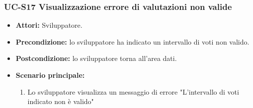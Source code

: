 	\subsubsection{UC-S17 Visualizzazione errore di valutazioni non valide}
		\begin{itemize}					
			\item \textbf{Attori:} Sviluppatore.
			\item \textbf{Precondizione:} lo sviluppatore ha indicato un intervallo di voti non valido.
			\item \textbf{Postcondizione:} lo sviluppatore torna all'area dati.
			\item \textbf{Scenario principale:}
				\begin{enumerate}
					\item Lo sviluppatore visualizza un messaggio di errore "L'intervallo di voti indicato non è valido"
				\end{enumerate}
		\end{itemize}